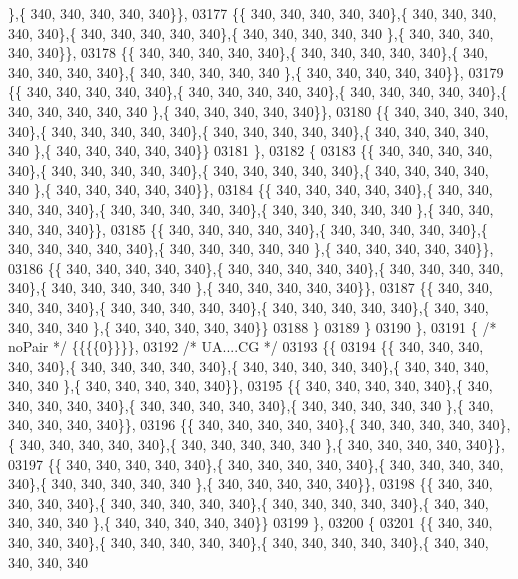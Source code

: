 \begin{DoxyCode}
      \},\{ 340, 340, 340, 340, 340\}\},
03177 \{\{ 340, 340, 340, 340, 340\},\{ 340, 340, 340, 340, 340\},\{ 340, 340, 340, 340, 340\},\{ 340, 340, 340, 340, 340
      \},\{ 340, 340, 340, 340, 340\}\},
03178 \{\{ 340, 340, 340, 340, 340\},\{ 340, 340, 340, 340, 340\},\{ 340, 340, 340, 340, 340\},\{ 340, 340, 340, 340, 340
      \},\{ 340, 340, 340, 340, 340\}\},
03179 \{\{ 340, 340, 340, 340, 340\},\{ 340, 340, 340, 340, 340\},\{ 340, 340, 340, 340, 340\},\{ 340, 340, 340, 340, 340
      \},\{ 340, 340, 340, 340, 340\}\},
03180 \{\{ 340, 340, 340, 340, 340\},\{ 340, 340, 340, 340, 340\},\{ 340, 340, 340, 340, 340\},\{ 340, 340, 340, 340, 340
      \},\{ 340, 340, 340, 340, 340\}\}
03181 \},
03182 \{
03183 \{\{ 340, 340, 340, 340, 340\},\{ 340, 340, 340, 340, 340\},\{ 340, 340, 340, 340, 340\},\{ 340, 340, 340, 340, 340
      \},\{ 340, 340, 340, 340, 340\}\},
03184 \{\{ 340, 340, 340, 340, 340\},\{ 340, 340, 340, 340, 340\},\{ 340, 340, 340, 340, 340\},\{ 340, 340, 340, 340, 340
      \},\{ 340, 340, 340, 340, 340\}\},
03185 \{\{ 340, 340, 340, 340, 340\},\{ 340, 340, 340, 340, 340\},\{ 340, 340, 340, 340, 340\},\{ 340, 340, 340, 340, 340
      \},\{ 340, 340, 340, 340, 340\}\},
03186 \{\{ 340, 340, 340, 340, 340\},\{ 340, 340, 340, 340, 340\},\{ 340, 340, 340, 340, 340\},\{ 340, 340, 340, 340, 340
      \},\{ 340, 340, 340, 340, 340\}\},
03187 \{\{ 340, 340, 340, 340, 340\},\{ 340, 340, 340, 340, 340\},\{ 340, 340, 340, 340, 340\},\{ 340, 340, 340, 340, 340
      \},\{ 340, 340, 340, 340, 340\}\}
03188 \}
03189 \}
03190 \},
03191 \{ \textcolor{comment}{/* noPair */} \{\{\{\{0\}\}\}\},
03192 \textcolor{comment}{/* UA....CG */}
03193 \{\{
03194 \{\{ 340, 340, 340, 340, 340\},\{ 340, 340, 340, 340, 340\},\{ 340, 340, 340, 340, 340\},\{ 340, 340, 340, 340, 340
      \},\{ 340, 340, 340, 340, 340\}\},
03195 \{\{ 340, 340, 340, 340, 340\},\{ 340, 340, 340, 340, 340\},\{ 340, 340, 340, 340, 340\},\{ 340, 340, 340, 340, 340
      \},\{ 340, 340, 340, 340, 340\}\},
03196 \{\{ 340, 340, 340, 340, 340\},\{ 340, 340, 340, 340, 340\},\{ 340, 340, 340, 340, 340\},\{ 340, 340, 340, 340, 340
      \},\{ 340, 340, 340, 340, 340\}\},
03197 \{\{ 340, 340, 340, 340, 340\},\{ 340, 340, 340, 340, 340\},\{ 340, 340, 340, 340, 340\},\{ 340, 340, 340, 340, 340
      \},\{ 340, 340, 340, 340, 340\}\},
03198 \{\{ 340, 340, 340, 340, 340\},\{ 340, 340, 340, 340, 340\},\{ 340, 340, 340, 340, 340\},\{ 340, 340, 340, 340, 340
      \},\{ 340, 340, 340, 340, 340\}\}
03199 \},
03200 \{
03201 \{\{ 340, 340, 340, 340, 340\},\{ 340, 340, 340, 340, 340\},\{ 340, 340, 340, 340, 340\},\{ 340, 340, 340, 340, 340

\end{DoxyCode}
